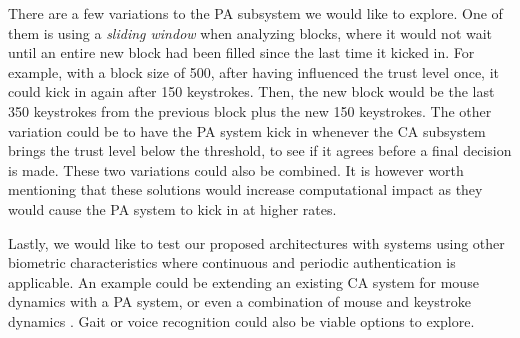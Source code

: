 There are a few variations to the PA subsystem we would like to explore.
One of them is using a \textit{sliding window} when analyzing blocks, where it would not wait until an entire new block had been filled since the last time it kicked in.
For example, with a block size of 500, after having influenced the trust level once, it could kick in again after 150 keystrokes.
Then, the new block would be the last 350 keystrokes from the previous block plus the new 150 keystrokes.
The other variation could be to have the PA system kick in whenever the CA subsystem brings the trust level below the threshold, to see if it agrees before a final decision is made.
These two variations could also be combined.
It is however worth mentioning that these solutions would increase computational impact as they would cause the PA system to kick in at higher rates.

Lastly, we would like to test our proposed architectures with systems using other biometric characteristics where continuous and periodic authentication is applicable.
An example could be extending an existing CA system for mouse dynamics \cite{mouse-dynamics} with a PA system, or even a combination of mouse and keystroke dynamics \cite{mouse-keystroke-dynamics}.
Gait or voice recognition could also be viable options to explore.


